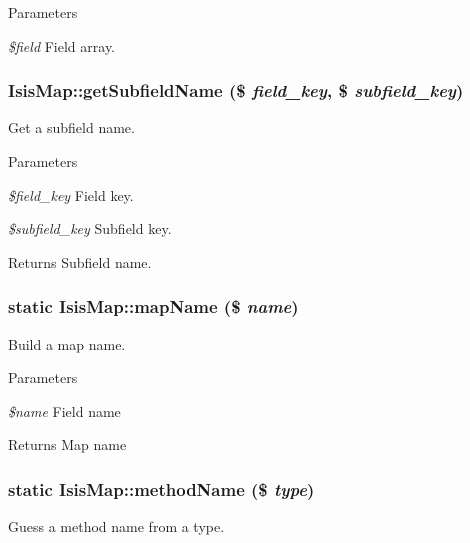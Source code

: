 \begin{DoxyParams}{Parameters}
\item[{\em \$field}]Field array. \end{DoxyParams}
\hypertarget{classIsisMap_a83ffdd84c385513a09e5ab523a44d6f2}{
\subsubsection[{getSubfieldName}]{\setlength{\rightskip}{0pt plus 5cm}IsisMap::getSubfieldName (\$ {\em field\_\-key}, \/  \$ {\em subfield\_\-key})}}
\label{classIsisMap_a83ffdd84c385513a09e5ab523a44d6f2}
Get a subfield name.


\begin{DoxyParams}{Parameters}
\item[{\em \$field\_\-key}]Field key.\item[{\em \$subfield\_\-key}]Subfield key.\end{DoxyParams}
\begin{DoxyReturn}{Returns}
Subfield name. 
\end{DoxyReturn}
\hypertarget{classIsisMap_a7f1b9b1cce7a02dea704a40ca85e2117}{
\subsubsection[{mapName}]{\setlength{\rightskip}{0pt plus 5cm}static IsisMap::mapName (\$ {\em name})}}
\label{classIsisMap_a7f1b9b1cce7a02dea704a40ca85e2117}
Build a map name.


\begin{DoxyParams}{Parameters}
\item[{\em \$name}]Field name\end{DoxyParams}
\begin{DoxyReturn}{Returns}
Map name 
\end{DoxyReturn}
\hypertarget{classIsisMap_af80aedabfeca623a9022dfcbc95d591c}{
\subsubsection[{methodName}]{\setlength{\rightskip}{0pt plus 5cm}static IsisMap::methodName (\$ {\em type})}}
\label{classIsisMap_af80aedabfeca623a9022dfcbc95d591c}
Guess a method name from a type.


